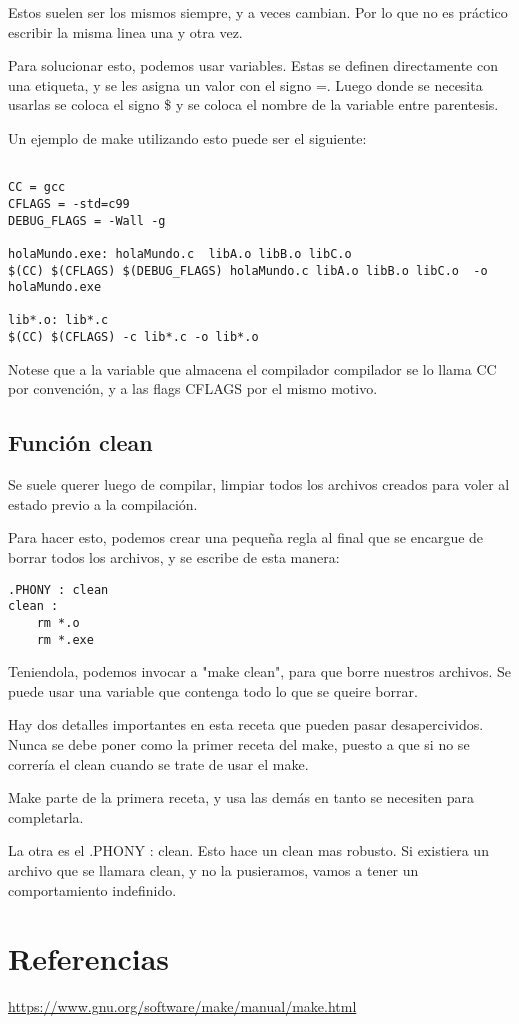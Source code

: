 \documentclass[]{article}
\begin{document}
Estos suelen ser los mismos siempre, y a veces cambian. Por lo que no es práctico escribir la misma linea una y otra vez. 

Para solucionar esto, podemos usar variables. Estas se definen directamente con una etiqueta, y se les asigna un valor con el signo =. Luego donde se necesita usarlas se coloca el signo \$ y se coloca el nombre de la variable entre parentesis. 

Un ejemplo de make utilizando esto puede ser el siguiente:

\begin{lstlisting}

CC = gcc
CFLAGS = -std=c99
DEBUG_FLAGS = -Wall -g

holaMundo.exe: holaMundo.c  libA.o libB.o libC.o
$(CC) $(CFLAGS) $(DEBUG_FLAGS) holaMundo.c libA.o libB.o libC.o  -o holaMundo.exe

lib*.o: lib*.c
$(CC) $(CFLAGS) -c lib*.c -o lib*.o 

\end{lstlisting} 

Notese que a la variable que almacena el compilador compilador se lo llama CC por convención, y a las flags CFLAGS por el mismo motivo.

\subsection{Función clean}

	Se suele querer luego de compilar, limpiar todos los archivos creados para voler al estado previo a la compilación.
	
	Para hacer esto, podemos crear una pequeña regla al final que se encargue de borrar todos los archivos, y se escribe de esta manera:
	
\begin{lstlisting}
.PHONY : clean
clean :
	rm *.o
	rm *.exe
\end{lstlisting} 

	Teniendola, podemos invocar a "make clean", para que borre nuestros archivos. Se puede usar una variable que contenga todo lo que se queire borrar.

	Hay dos detalles importantes en esta receta que pueden pasar desapercividos. Nunca se debe poner como la primer receta del make, puesto a que si no se correría el clean cuando se trate de usar el make.
	
	Make parte de la primera receta, y usa las demás en tanto se necesiten para completarla.
	
	La otra es el .PHONY : clean. Esto hace un clean mas robusto. Si existiera un archivo que se llamara clean, y no la pusieramos, vamos a tener un comportamiento indefinido. 
	
\section{Referencias}

	\url{https://www.gnu.org/software/make/manual/make.html}
	
\end{document}
